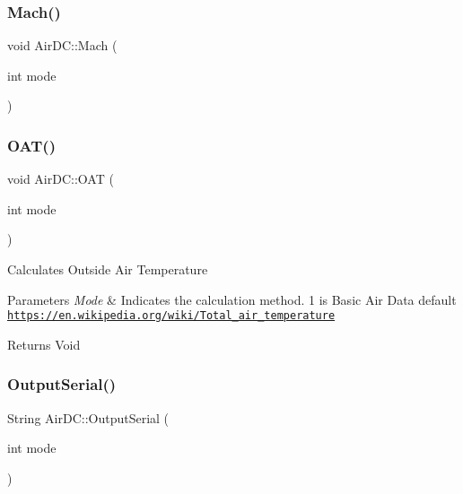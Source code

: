\subsubsection{\texorpdfstring{Mach()}{Mach()}}
{\footnotesize\ttfamily void Air\+D\+C\+::\+Mach (\begin{DoxyParamCaption}\item[{int}]{mode }\end{DoxyParamCaption})}

\mbox{\label{class_air_d_c_a4ce45312b9ac98b76af87f1718c4e0fc}} 
\subsubsection{\texorpdfstring{O\+A\+T()}{OAT()}}
{\footnotesize\ttfamily void Air\+D\+C\+::\+O\+AT (\begin{DoxyParamCaption}\item[{int}]{mode }\end{DoxyParamCaption})}

Calculates Outside Air Temperature 
\begin{DoxyParams}{Parameters}
{\em Mode} & Indicates the calculation method. 1 is Basic Air Data default \href{https://en.wikipedia.org/wiki/Total_air_temperature}{\tt https\+://en.\+wikipedia.\+org/wiki/\+Total\+\_\+air\+\_\+temperature} \\
\hline
\end{DoxyParams}
\begin{DoxyReturn}{Returns}
Void 
\end{DoxyReturn}
\mbox{\label{class_air_d_c_a328439b2a9e401655b952d2a67931700}} 
\subsubsection{\texorpdfstring{Output\+Serial()}{OutputSerial()}}
{\footnotesize\ttfamily String Air\+D\+C\+::\+Output\+Serial (\begin{DoxyParamCaption}\item[{int}]{mode }\end{DoxyParamCaption})}

\mbox{\label{class_air_d_c_a7b2dbfed69544bced169d425b55a9cd8}} 

